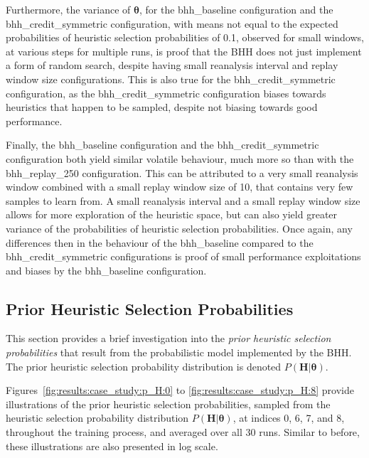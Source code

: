 Furthermore, the variance of $\boldsymbol{\theta}$, for the bhh\_baseline configuration and the bhh\_credit\_symmetric configuration, with means not equal to the expected probabilities of heuristic selection probabilities of 0.1, observed for small windows, at various steps for multiple runs, is proof that the \acs{BHH} does not just implement a form of random search, despite having small reanalysis interval and replay window size configurations. This is also true for the bhh\_credit\_symmetric configuration, as the bhh\_credit\_symmetric configuration biases towards heuristics that happen to be sampled, despite not biasing towards good performance.

Finally, the bhh\_baseline configuration and the bhh\_credit\_symmetric configuration both yield similar volatile behaviour, much more so than with the bhh\_replay\_250 configuration. This can be attributed to a very small reanalysis window combined with a small replay window size of 10, that contains very few samples to learn from. A small reanalysis interval and a small replay window size allows for more exploration of the heuristic space, but can also yield greater variance of the probabilities of heuristic selection probabilities. Once again, any differences then in the behaviour of the bhh\_baseline compared to the bhh\_credit\_symmetric configurations is proof of small performance exploitations and biases by the bhh\_baseline configuration.



\subsection{Prior Heuristic Selection Probabilities}\label{sec:results:case_study:prior_selec_prob}

This section provides a brief investigation into the \textit{prior heuristic selection probabilities} that result from the probabilistic model implemented by the \acs{BHH}. The prior heuristic selection probability distribution is denoted $P(\boldsymbol{H} \vert \boldsymbol{\theta})$.

Figures~\ref{fig:results:case_study:p_H:0} to \ref{fig:results:case_study:p_H:8} provide illustrations of the prior heuristic selection probabilities, sampled from the heuristic selection probability distribution $P(\boldsymbol{H} \vert \boldsymbol{\theta})$, at indices 0, 6, 7, and 8, throughout the training process, and averaged over all 30 runs. Similar to before, these illustrations are also presented in log scale.

